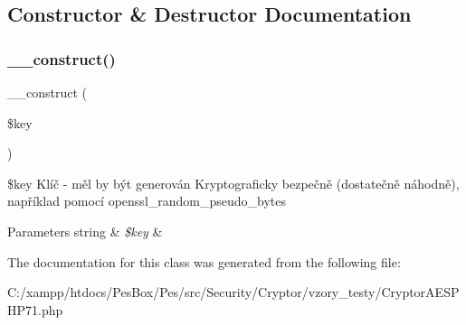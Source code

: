 \subsection{Constructor \& Destructor Documentation}
\mbox{\label{class_pes_1_1_security_1_1_cryptor_1_1_cryptor_a_e_s_p_h_p71_ae68e3281fdc4689e22a68b4b463c5fa9}} 
\subsubsection{\texorpdfstring{\+\_\+\+\_\+construct()}{\_\_construct()}}
{\footnotesize\ttfamily \+\_\+\+\_\+construct (\begin{DoxyParamCaption}\item[{}]{\$key }\end{DoxyParamCaption})}

\$key Klíč -\/ měl by být generován Kryptograficky bezpečně (dostatečně náhodně), například pomocí openssl\+\_\+random\+\_\+pseudo\+\_\+bytes 
\begin{DoxyParams}[1]{Parameters}
string & {\em \$key} & \\
\hline
\end{DoxyParams}


The documentation for this class was generated from the following file\+:\begin{DoxyCompactItemize}
\item 
C\+:/xampp/htdocs/\+Pes\+Box/\+Pes/src/\+Security/\+Cryptor/vzory\+\_\+testy/Cryptor\+A\+E\+S\+P\+H\+P71.\+php\end{DoxyCompactItemize}

